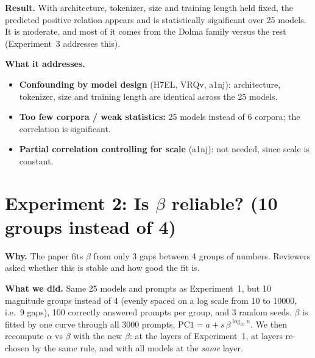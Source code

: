 \textbf{Result.} With architecture, tokenizer, size and training length held fixed, the predicted
positive relation appears and is statistically significant over 25 models. It is moderate, and most
of it comes from the Dolma family versus the rest (Experiment~3 addresses this).

\textbf{What it addresses.}
\begin{itemize}
\item \textbf{Confounding by model design} (H7EL, VRQv, a1nj): architecture, tokenizer, size and
  training length are identical across the 25 models.
\item \textbf{Too few corpora / weak statistics:} 25 models instead of 6 corpora; the correlation is
  significant.
\item \textbf{Partial correlation controlling for scale} (a1nj): not needed, since scale is constant.
\end{itemize}

\clearpage
\section{Experiment 2: Is $\beta$ reliable? (10 groups instead of 4)}

\textbf{Why.} The paper fits $\beta$ from only 3 gaps between 4 groups of numbers. Reviewers asked
whether this is stable and how good the fit is.

\textbf{What we did.} Same 25 models and prompts as Experiment~1, but 10 magnitude groups instead of
4 (evenly spaced on a log scale from 10 to 10000, i.e.\ 9 gaps), 100 correctly answered prompts per
group, and 3 random seeds. $\beta$ is fitted by one curve through all 3000 prompts,
$\text{PC1} = a + s\,\beta^{\log_{10} n}$. We then recompute $\alpha$ vs $\beta$ with the new $\beta$:
at the layers of Experiment~1, at layers re-chosen by the same rule, and with all models at the
\emph{same} layer.

